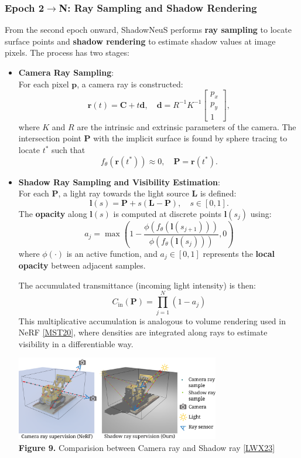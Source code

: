 \documentclass[12pt,a4paper]{article}
\theoremstyle{definition}
\begin{document}
\subsubsection{Epoch 2$\to$N: Ray Sampling and Shadow Rendering} \label{sec:epoch2_ray_sampling}

From the second epoch onward, ShadowNeuS performs \textbf{ray sampling} to locate surface points and \textbf{shadow rendering} to estimate shadow values at image pixels. The process has two stages:

\begin{itemize}[noitemsep, topsep=0pt]
    \item \textbf{Camera Ray Sampling}: \\
    For each pixel $\mathbf{p}$, a camera ray is constructed:
    \[
    \mathbf{r}(t) = \mathbf{C} + t \mathbf{d}, \quad \mathbf{d} = R^{-1} K^{-1} \begin{bmatrix} p_x \\ p_y \\ 1 \end{bmatrix},
    \]
    where $K$ and $R$ are the intrinsic and extrinsic parameters of the camera. The intersection point $\mathbf{P}$ with the implicit surface is found by sphere tracing to locate $t^*$ such that
    \[
    f_\theta(\mathbf{r}(t^*)) \approx 0, \quad \mathbf{P} = \mathbf{r}(t^*).
    \]

    \item \textbf{Shadow Ray Sampling and Visibility Estimation}: \\ 
    For each $\mathbf{P}$, a light ray towards the light source $\mathbf{L}$ is defined:
    \[
    \mathbf{l}(s) = \mathbf{P} + s (\mathbf{L} - \mathbf{P}), \quad s \in [0, 1].
    \]
    The \textbf{opacity} along $\mathbf{l}(s)$ is computed at discrete points $\mathbf{l}(s_j)$ using:
    \[
    a_j = \max\left( 1 - \frac{ \phi(f_\theta(\mathbf{l}(s_{j+1})) ) }{ \phi(f_\theta(\mathbf{l}(s_j))) }, 0 \right)
    \]
    where $\phi(\cdot)$ is an active function, and $a_j \in [0,1]$ represents the \textbf{local opacity} between adjacent samples.

    The accumulated transmittance (incoming light intensity) is then:
    \[
    C_{\mathrm{in}}(\mathbf{P}) = \prod_{j=1}^N (1 - a_j)
    \]
    This multiplicative accumulation is analogous to volume rendering used in NeRF \hyperlink{[MST20]}{[MST20]}, where densities are integrated along rays to estimate visibility in a differentiable way.
    \begin{center}
        \includegraphics[width=0.7\textwidth]{shadowneus_rays.png} \\
        \textbf{Figure 9.} Comparision between Camera ray and Shadow ray \hyperlink{[LWX23]}{[LWX23]}
    \end{center}

\end{itemize}
\end{document}
